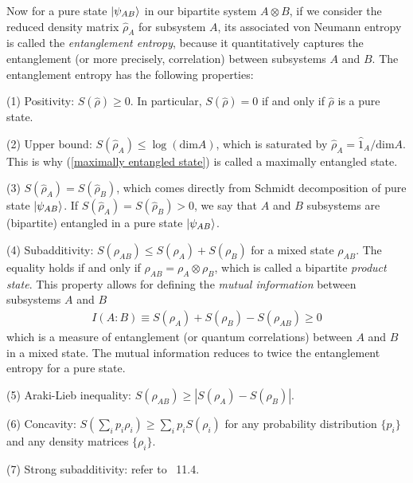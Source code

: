 Now for a pure state $|{\psi_{AB}}\rangle$ in our bipartite system $A\otimes B$, if we consider the reduced density matrix $\hat\rho_A$ for subsystem $A$, its associated von Neumann entropy is called the \emph{entanglement entropy}, because it quantitatively captures the entanglement (or more precisely, correlation) between subsystems $A$ and $B$. The entanglement entropy has the following properties: 

(1) Positivity: $S(\hat\rho)\geq0$. In particular, $S(\hat\rho)=0$ if and only if $\hat\rho$ is a pure state. 

(2) Upper bound: $S(\hat\rho_A)\leq\log(\text{dim}A)$, which is saturated by $\hat\rho_A=\hat 1_A/\text{dim} A$. This is why (\ref{maximally entangled state}) is called a maximally entangled state. 

(3) $S(\hat\rho_A)=S(\hat\rho_B)$, which comes directly from Schmidt decomposition of pure state $|{\psi_{AB}}\rangle$. If $S(\hat\rho_A)=S(\hat\rho_B)>0$, we say that $A$ and $B$ subsystems are (bipartite) entangled in a pure state $|{\psi_{AB}}\rangle$.

(4) Subadditivity: $S(\rho_{AB})\leq S(\rho_A)+S(\rho_B)$ for a mixed state $\rho_{AB}$. The equality holds if and only if $\rho_{AB}=\rho_A\otimes\rho_B$, which is called a bipartite \emph{product state}. This property allows for defining the \emph{mutual information} between subsystems $A$ and $B$
\begin{align}
I(A:B)\equiv S(\rho_A)+S(\rho_B)-S(\rho_{AB})\geq0
\end{align}
which is a measure of entanglement (or quantum correlations) between $A$ and $B$ in a mixed state. The mutual information reduces to twice the entanglement entropy for a pure state. 

(5) Araki-Lieb inequality: $S(\rho_{AB})\geq|S(\rho_A)-S(\rho_B)|$.

(6) Concavity: $S(\sum_i p_i\rho_i)\geq\sum_ip_iS(\rho_i)$ for any probability distribution $\{p_i\}$ and any density matrices $\{\rho_i\}$.

(7) Strong subadditivity: refer to \nielsen~11.4. 
